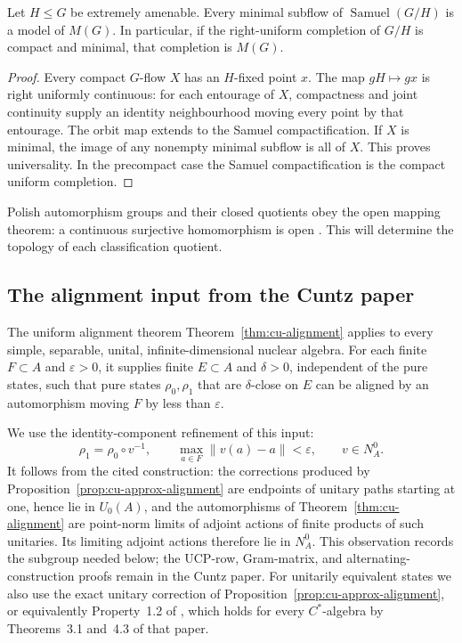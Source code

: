 \begin{lemma}\label{lem:un-samuel}
Let \(H\leq G\) be extremely amenable. Every minimal subflow of
\(\operatorname{Samuel}(G/H)\) is a model of \(M(G)\).
In particular, if the right-uniform completion of \(G/H\) is compact
and minimal, that completion is \(M(G)\).
\end{lemma}
\begin{proof}
Every compact \(G\)-flow \(X\) has an \(H\)-fixed point \(x\).
The map \(gH\mapsto gx\) is right uniformly continuous: for each
entourage of \(X\), compactness and joint continuity supply an
identity neighbourhood moving every point by that entourage.
The orbit map extends to the Samuel compactification.
If \(X\) is minimal, the image of any nonempty minimal subflow is
all of \(X\). This proves universality. In the precompact case the
Samuel compactification is the compact uniform completion.
\end{proof}

Polish automorphism groups and their closed quotients obey the open
mapping theorem: a continuous surjective homomorphism is open
\cite{BeckerKechris1996}. This will determine the topology of each
classification quotient.


\subsection{The alignment input from the Cuntz paper}\label{sec:un-alignment}

The uniform alignment theorem
Theorem~\ref{thm:cu-alignment} applies to every simple, separable,
unital, infinite-dimensional nuclear algebra. For each finite
\(F\subset A\) and \(\varepsilon>0\), it supplies finite
\(E\subset A\) and \(\delta>0\), independent of the pure states,
such that pure states \(\rho_0,\rho_1\) that are \(\delta\)-close on \(E\)
can be aligned by an automorphism moving \(F\) by less than
\(\varepsilon\).

We use the identity-component refinement of this input:
\[
 \rho_1=\rho_0\circ v^{-1},\qquad
 \max_{a\in F}\left\lVert v(a)-a\right\rVert<\varepsilon,
 \qquad v\in N_A^0.
\]
It follows from the cited construction: the corrections produced by
Proposition~\ref{prop:cu-approx-alignment} are endpoints of unitary paths
starting at one, hence lie in \(U_0(A)\), and the automorphisms of
Theorem~\ref{thm:cu-alignment} are point-norm limits of adjoint
actions of finite products of such unitaries. Its limiting adjoint
actions therefore lie in \(N_A^0\). This observation records the subgroup needed below;
the UCP-row, Gram-matrix, and alternating-construction proofs remain
in the Cuntz paper. For unitarily equivalent states we also use the
exact unitary correction of Proposition~\ref{prop:cu-approx-alignment},
or equivalently Property~1.2 of \cite{KishimotoOzawaSakai2003}, which holds for every
$C^*$-algebra by Theorems~3.1 and~4.3 of that paper.


